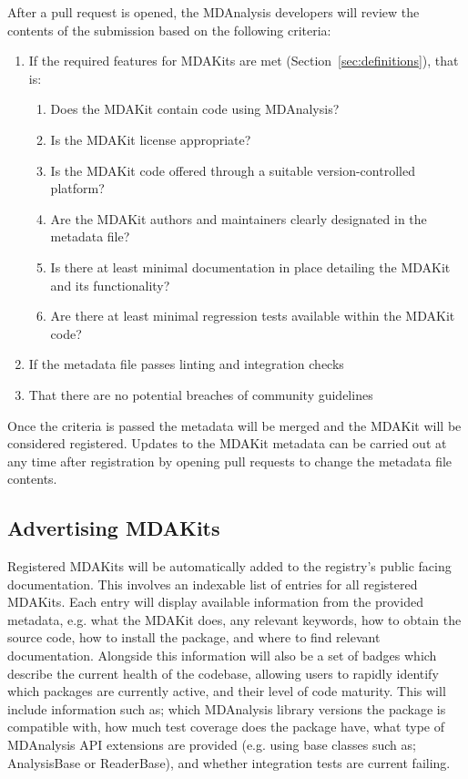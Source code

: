 \documentclass[9pt,whitepaper]{livecoms}
\begin{document}
After a pull request is opened, the MDAnalysis developers will review the contents of the submission based on the following criteria:
\begin{enumerate}
    \item If the required features for MDAKits are met (Section~\ref{sec:definitions}), that is:
    \begin{enumerate}
        \item Does the MDAKit contain code using MDAnalysis?
        \item Is the MDAKit license appropriate?
        \item Is the MDAKit code offered through a suitable version-controlled platform?
        \item Are the MDAKit authors and maintainers clearly designated in the metadata file?
        \item Is there at least minimal documentation in place detailing the MDAKit and its functionality?
        \item Are there at least minimal regression tests available within the MDAKit code?
    \end{enumerate}
    \item If the metadata file passes linting and integration checks
    \item That there are no potential breaches of community guidelines
\end{enumerate}
Once the criteria is passed the metadata will be merged and the MDAKit will be considered registered. Updates to the MDAKit metadata can be carried out at any time after registration by opening pull requests to change the metadata file contents.

\subsection{Advertising MDAKits}
\label{sec:advertising}

Registered MDAKits will be automatically added to the registry’s public facing documentation. This involves an indexable list of entries for all registered MDAKits. Each entry will display available information from the provided metadata, e.g. what the MDAKit does, any relevant keywords, how to obtain the source code, how to install the package, and where to find relevant documentation. Alongside this information will also be a set of badges which describe the current health of the codebase, allowing users to rapidly identify which packages are currently active, and their level of code maturity. This will include information such as; which MDAnalysis library versions the package is compatible with, how much test coverage does the package have, what type of MDAnalysis API extensions are provided (e.g. using base classes such as; AnalysisBase or ReaderBase), and whether integration tests are current failing.
\end{document}
